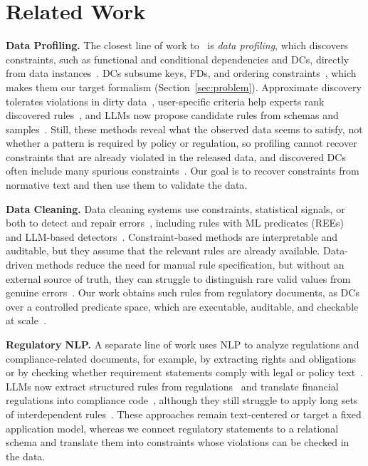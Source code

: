 \section{Related Work}
\label{sec:related}

\noindent\textbf{Data Profiling.}
The closest line of work to \system\ is \emph{data profiling}, which discovers constraints, such as functional and conditional dependencies and DCs, directly from data instances~\cite{profSurveyFelix2015,Huhtala1998TANE,Fan2009DiscoverCFD,Papenbrock2016HyFD,Bleifuss2017Hydra,chu2013discovering,Pena2022FastDC,icdePena2024}. DCs subsume keys, FDs, and ordering constraints~\cite{chu2013discovering}, which makes them our target formalism (Section~\ref{sec:problem}). Approximate discovery tolerates violations in dirty data~\cite{Pena2019DiscoveryDC,martin2026lima}, user-specific criteria help experts rank discovered rules~\cite{fan2023topk}, and LLMs now propose candidate rules from schemas and samples~\cite{biester2024llmclean,glock2026ledqer,li2026lcats}. Still, these methods reveal what the observed data seems to satisfy, not whether a pattern is required by policy or regulation, so profiling cannot recover constraints that are already violated in the released data, and discovered DCs often include many spurious constraints~\cite{martin2025false}. Our goal is to recover constraints from normative text and then use them to validate the data.


\smallskip
\noindent\textbf{Data Cleaning.}
Data cleaning systems use constraints, statistical signals, or both to detect and repair errors~\cite{dataerrorsZiawash,chu2013holistic,holoclean,raha2019,peng2022garf,cleaningDeploy2024}, including rules with ML predicates (REEs)~\cite{bao2024rock} and LLM-based detectors~\cite{ni2025zeroed,zhang2024cleaning}. Constraint-based methods are interpretable and auditable, but they assume that the relevant rules are already available. Data-driven methods reduce the need for manual rule specification, but without an external source of truth, they can struggle to distinguish rare valid values from genuine errors~\cite{cleaningDeploy2024}. Our work obtains such rules from regulatory documents, as DCs over a controlled predicate space, which are executable, auditable, and checkable at scale~\cite{facet2021,liu2024rapidash,youri2024}.

\smallskip
\noindent\textbf{Regulatory NLP.}
A separate line of work uses NLP to analyze regulations and compliance-related documents, for example, by extracting rights and obligations or by checking whether requirement statements comply with legal or policy text~\cite{breaux2006regulatory,kiyavitskaya2008automating,amaral2023nlp,hassani2024rethinking,compliance2025ACMTSEM,masoudifard2024graphrag}. LLMs now extract structured rules from regulations~\cite{guliani2026dejure,hettiarachchi-etal-2025-code,kabzhan2025semantic} and translate financial regulations into compliance code~\cite{li2025compliance2code}, although they still struggle to apply long sets of interdependent rules~\cite{yu2026ruleworld,soni2026tam}. These approaches remain text-centered or target a fixed application model, whereas we connect regulatory statements to a relational schema and translate them into constraints whose violations can be checked in the data.

